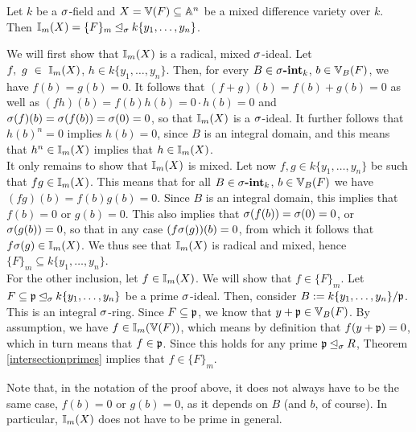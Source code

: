 \begin{prop}\label{I=F_m}
Let $k$ be a $\sigma$-field and $X = \mathbb{V}(F) \subseteq \mathbb{A}^n$ be a mixed difference variety over $k$. Then $\mathbb{I}_m(X) = \{F\}_m \unlhd_{\sigma} k\{y_1,\ldots,y_n\}$. 
\begin{bew}
We will first show that $\mathbb{I}_m(X)$ is a radical, mixed $\sigma$-ideal.
Let \\ $f,~g~\in~\mathbb{I}_m(X)$, $h \in k\{y_1,\ldots,y_n\}$. Then, for every $B \in \sigma\text{{\normalfont\textbf{-int}}}_k$, $b \in \mathbb{V}_B(F)$, we have $f(b) = g(b) = 0$.
It follows that $(f + g)(b) = f(b) + g(b) = 0$ as well as $(fh)(b) = f(b)h(b) = 0 \cdot h(b) = 0$ and $\sigma(f)(b) = \sigma(f(b)) = \sigma(0) = 0$, so that $\mathbb{I}_m(X)$ is a $\sigma$-ideal.
It further follows that $h(b)^n = 0$ implies $h(b) = 0$, since $B$ is an integral domain, and this means that $h^n \in \mathbb{I}_m(X)$ implies that $ h \in \mathbb{I}_m(X)$. \\
\indent It only remains to show that $\mathbb{I}_m(X)$ is mixed. Let now $f,g \in k\{y_1,\ldots,y_n\}$ be such that $fg \in \mathbb{I}_m(X)$. This means that for all  $B \in \sigma\text{{\normalfont\textbf{-int}}}_k$, $b \in \mathbb{V}_B(F)$ we have
 $(fg)(b) = f(b) g(b) = 0$. Since $B$ is an integral domain,
this implies that $f(b) = 0$ or $g(b) = 0$. This also implies that $\sigma(f(b)) = \sigma(0) = 0$, or $\sigma(g(b)) = 0$, so that in any case $(f\sigma(g))(b) = 0$, from which it follows that $f\sigma(g) \in \mathbb{I}_m(X)$. We thus see that $\mathbb{I}_m(X)$ is radical and mixed, hence $\{F\}_m \subseteq k\{y_1,\ldots,y_n\}$. \\
\indent For the other inclusion, let $f \in \mathbb{I}_m(X)$. We will show that $f \in \{F\}_m$. Let $F \subseteq \mathfrak{p} \unlhd_{\sigma} k\{y_1,\ldots,y_n\}$ be a prime $\sigma$-ideal.
Then, consider $B:= k\{y_1,\ldots,y_n\}/\mathfrak{p}$. This is an integral $\sigma$-ring. Since $F \subseteq \mathfrak{p}$, we know that $y + \mathfrak{p} \in \mathbb{V}_B(F)$. By assumption, we have $f \in \mathbb{I}_m(\mathbb{V}(F))$, which means by definition that $f(y + \mathfrak{p}) = 0$, which
in turn means that $f \in \mathfrak{p}$. Since this holds for any prime $\mathfrak{p} \unlhd_{\sigma} R$, Theorem \ref{intersectionprimes} implies that $f \in \{F\}_m$.
\end{bew}
\end{prop}
Note that, in the notation of the proof above,  it does not always have to be the same case, $f(b) = 0$ or $g(b) = 0$, as it depends on $B$ (and $b$, of course). In particular, $\mathbb{I}_m(X)$ does not have to be prime in general. \\


